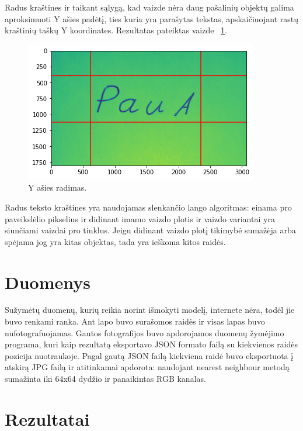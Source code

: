 \documentclass[conference]{IEEEtran}
\begin{document}
\par
Radus kraštines ir taikant sąlygą, kad vaizde nėra daug pašalinių objektų galima
aproksimuoti Y ašies padėtį, ties kuria yra parašytas tekstas, apskaičiuojant rastų kraštinių
taškų Y koordinates. Rezultatas pateiktas vaizde ~\ref{fig4}.

\begin{figure}[!h] %
\centerline{\includegraphics[scale=0.4] {images/aprox.png}}
\caption{Y ašies radimas.}
\label{fig4}
\end{figure}

\par
Radus teksto kraštines yra naudojamas slenkančio lango algoritmas: einama
pro paveikslėlio pikselius ir didinant imamo vaizdo plotis ir vaizdo variantai yra
 siunčiami vaizdai pro
tinklus. Jeigu didinant vaizdo plotį tikimybė sumažėja arba spėjama jog yra kitas
objektas, tada yra ieškoma kitos raidės.

\section{Duomenys}

Sužymėtų duomenų, kurių reikia norint išmokyti modelį, internete nėra, todėl
jie buvo renkami ranka. Ant lapo buvo surašomos raidės ir visas lapas buvo
nufotografuojamas. Gautos fotografijos buvo apdorojamos duomenų žymėjimo programa,
kuri kaip rezultatą eksportavo JSON formato failą su kiekvienos raidės pozicija
nuotraukoje. Pagal gautą JSON failą kiekviena raidė buvo eksportuota į atskirą JPG
failą ir atitinkamai apdorota: naudojant nearest neighbour metodą sumažinta iki
64x64 dydžio ir panaikintas RGB kanalas.

\section{Rezultatai}
\end{document}
